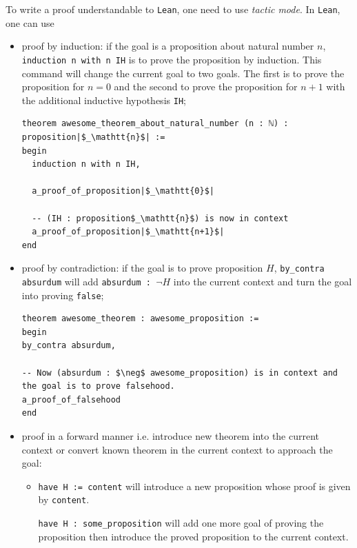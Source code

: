 \documentclass{report}
\theoremstyle{definition}
\begin{document}
To write a proof understandable to {\tt \small Lean}, one need to use {\it tactic mode}. In {\tt \small Lean}, one can use
\begin{itemize}
  \item proof by induction: if the goal is a proposition about natural number $n$, {\tt \small induction n with n IH} is to prove the proposition by induction. This command will change the current goal to two goals. The first is to prove the proposition for $n=0$ and the second to prove the proposition for $n+1$ with the additional inductive hypothesis {\tt \small IH};

\begin{verbatim}
theorem awesome_theorem_about_natural_number (n : ℕ) : proposition|$_\mathtt{n}$| :=
begin
  induction n with n IH,

  a_proof_of_proposition|$_\mathtt{0}$|

  -- (IH : proposition$_\mathtt{n}$) is now in context
  a_proof_of_proposition|$_\mathtt{n+1}$|
end
\end{verbatim}

  \item proof by contradiction: if the goal is to prove proposition $H$, {\tt \small by\_contra absurdum} will add {\tt \small absurdum : $\neg H$} into the current context and turn the goal into proving {\tt \small false};

\begin{verbatim}
theorem awesome_theorem : awesome_proposition :=
begin
by_contra absurdum,

-- Now (absurdum : $\neg$ awesome_proposition) is in context and the goal is to prove falsehood.
a_proof_of_falsehood
end
\end{verbatim}
  \item proof in a forward manner i.e. introduce new theorem into the current context or convert known theorem in the current context to approach the goal:
  \begin{itemize}
    \item {\tt \small have H := content} will introduce a new proposition whose proof is given by {\tt \small content}.
    
    {\tt \small have H : some\_proposition} will add one more goal of proving the proposition then introduce the proved proposition to the current context.


\end{itemize}
\end{itemize}
\end{document}

